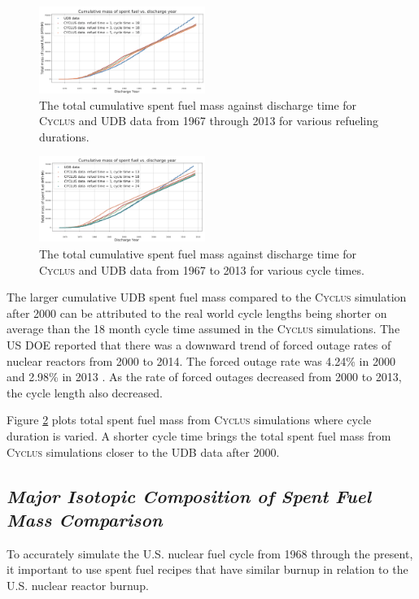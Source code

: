 \documentclass{anstrans}
\newcommand{\Cyclus}{\textsc{Cyclus}\xspace}%
\begin{document}
\begin{figure}[t] 
	\centering
	\includegraphics[width=0.48\textwidth]{figures/total_cumulative_mass_spent_fuel_refueltime}
	\caption{The total cumulative spent fuel mass against discharge time for \Cyclus and \gls{UDB} data from 1967 through 2013 for various refueling durations.}
	\label{fig:total_refueltime}
\end{figure} 

\begin{figure}[b] %
	\centering
	\includegraphics[width=0.48\textwidth]{figures/total_cumulative_mass_spent_fuel_cycletime}
	\caption{The total cumulative spent fuel mass against discharge time for \Cyclus and \gls{UDB} data from 1967 to 2013 for various cycle times.}
	\label{fig:total_cycletime}
\end{figure} 

The larger cumulative \gls{UDB} spent fuel mass compared to the \Cyclus simulation 
after 2000 can be attributed to the real world cycle lengths being shorter on 
average than the 18 month cycle time assumed in the  \Cyclus simulations. The 
\gls{US} \gls{DOE} reported that there was a downward trend of forced outage 
rates of nuclear reactors from 2000 to 2014. The forced outage rate was 4.24\% 
in 2000 and 2.98\% in 2013 \cite{gehin_nuclear_2016}. As the rate of forced 
outages decreased from 2000 to 2013, the cycle length also decreased. 

Figure \ref{fig:total_cycletime} plots total spent fuel mass from 
\Cyclus simulations where cycle duration is varied. A shorter cycle time brings the 
total spent fuel mass from \Cyclus simulations closer to the \gls{UDB} data after 
2000. 

\subsection{\textit{Major Isotopic Composition of  Spent Fuel Mass Comparison}}
To accurately simulate the U.S. nuclear fuel cycle from 1968 through the present, 
it important to use spent fuel recipes that have similar burnup in relation to 
the U.S. nuclear reactor burnup. 
\end{document}
